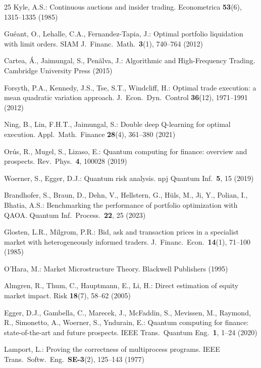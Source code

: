 \documentclass[11pt]{article}
\begin{document}
\begin{thebibliography}{25}
Kyle, A.S.: Continuous auctions and insider trading. Econometrica \textbf{53}(6), 1315--1335 (1985)

Gu{\'e}ant, O., Lehalle, C.A., Fernandez-Tapia, J.: Optimal portfolio liquidation with limit orders. SIAM J.\ Financ.\ Math.\ \textbf{3}(1), 740--764 (2012)

Cartea, {\'A}., Jaimungal, S., Pen\~{a}lva, J.: Algorithmic and High-Frequency Trading. Cambridge University Press (2015)

Forsyth, P.A., Kennedy, J.S., Tse, S.T., Windcliff, H.: Optimal trade execution: a mean quadratic variation approach. J.\ Econ.\ Dyn.\ Control \textbf{36}(12), 1971--1991 (2012)

Ning, B., Lin, F.H.T., Jaimungal, S.: Double deep Q-learning for optimal execution. Appl.\ Math.\ Finance \textbf{28}(4), 361--380 (2021)

Or{\'u}s, R., Mugel, S., Lizaso, E.: Quantum computing for finance: overview and prospects. Rev.\ Phys.\ \textbf{4}, 100028 (2019)

Woerner, S., Egger, D.J.: Quantum risk analysis. npj Quantum Inf.\ \textbf{5}, 15 (2019)

Brandhofer, S., Braun, D., Dehn, V., Hellstern, G., H\"uls, M., Ji, Y., Polian, I., Bhatia, A.S.: Benchmarking the performance of portfolio optimization with QAOA. Quantum Inf.\ Process.\ \textbf{22}, 25 (2023)

Glosten, L.R., Milgrom, P.R.: Bid, ask and transaction prices in a specialist market with heterogeneously informed traders. J.\ Financ.\ Econ.\ \textbf{14}(1), 71--100 (1985)

O'Hara, M.: Market Microstructure Theory. Blackwell Publishers (1995)

Almgren, R., Thum, C., Hauptmann, E., Li, H.: Direct estimation of equity market impact. Risk \textbf{18}(7), 58--62 (2005)

Egger, D.J., Gambella, C., Marecek, J., McFaddin, S., Mevissen, M., Raymond, R., Simonetto, A., Woerner, S., Yndurain, E.: Quantum computing for finance: state-of-the-art and future prospects. IEEE Trans.\ Quantum Eng.\ \textbf{1}, 1--24 (2020)

Lamport, L.: Proving the correctness of multiprocess programs. IEEE Trans.\ Softw.\ Eng.\ \textbf{SE-3}(2), 125--143 (1977)

\end{thebibliography}
\end{document}
